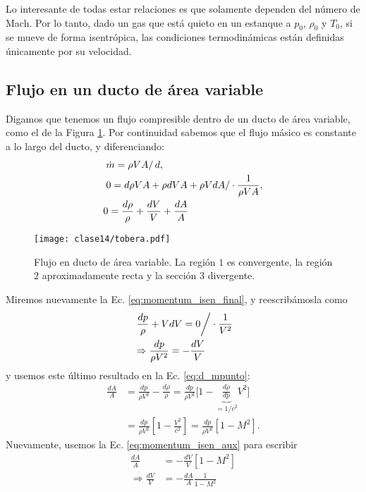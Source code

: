 Lo interesante de todas estar relaciones es que solamente dependen del número de Mach. 
Por lo tanto, dado un gas que está quieto en un estanque a $p_0$, $\rho_0$ y $T_0$, si se mueve de forma isentrópica, las condiciones termodinámicas están definidas únicamente por su velocidad.

\subsection*{Flujo en un ducto de área variable}

Digamos que tenemos un flujo compresible dentro de un ducto de área variable, como el de la Figura \ref{fig:tobera}. 
Por continuidad sabemos que el flujo másico es constante a lo largo del ducto, y diferenciando:
%
\begin{align}\label{eq:d_mpunto}
&\left.\dot{m}=\rho V A\right/ d,\nonumber\\
&\left.0 = d\rho VA + \rho dV A + \rho V dA\right/\cdot\frac{1}{\rho VA}, \nonumber\\
&0 = \frac{d\rho}{\rho} + \frac{dV}{V} + \frac{dA}{A}  
\end{align}

\begin{figure}
\centering
\texttt{[image: clase14/tobera.pdf]}
\caption{Flujo en ducto de área variable. La región $1$ es convergente, la región $2$ aproximadamente recta y la sección $3$ divergente.}
\label{fig:tobera}
\end{figure}

Miremos nuevamente la Ec. \eqref{eq:momentum_isen_final}, y reescribámosla como
%
\begin{align}\label{eq:momentum_isen_aux}
&\left.\frac{dp}{\rho} + VdV = 0\right/\cdot\frac{1}{V^2}\nonumber\\
&\Rightarrow\frac{dp}{\rho V^2} = -\frac{dV}{V}
\end{align}
%
y usemos este último resultado en la Ec. \eqref{eq:d_mpunto}:
%
\begin{align}
\frac{dA}{A} &= \frac{dp}{\rho V^2} - \frac{d\rho}{\rho} = \frac{dp}{\rho V^2} \Big[1-\underbrace{\frac{d\rho}{dp}}_{=1/c^2} V^2\Big]\nonumber\\
&=\frac{dp}{\rho V^2} \left[ 1-\frac{V^2}{c^2}\right] = \frac{dp}{\rho V^2}\left[1-M^2\right].
\end{align}
%
Nuevamente, usemos la Ec. \eqref{eq:momentum_isen_aux} para escribir
%
\begin{align}\label{eq:tobera}
\frac{dA}{A} &= -\frac{dV}{V}\left[1-M^2\right]\nonumber\\
\Rightarrow \frac{dV}{V}&=-\frac{dA}{A}\frac{1}{1-M^2}
\end{align}

